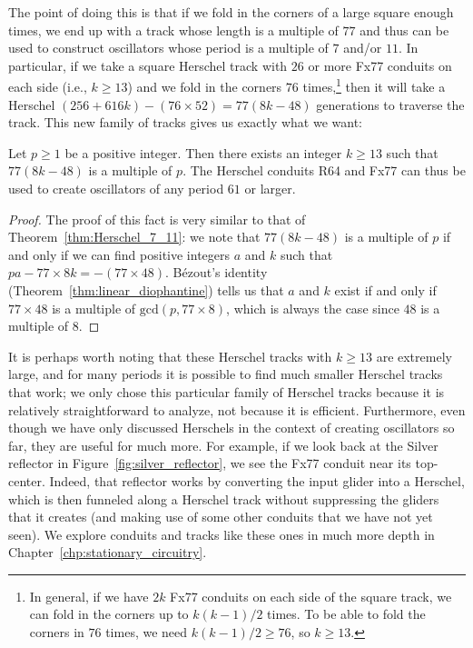 The point of doing this is that if we fold in the corners of a large square enough times, we end up with a track whose length is a multiple of $77$ and thus can be used to construct oscillators whose period is a multiple of $7$ and/or $11$. In particular, if we take a square Herschel track with $26$ or more Fx77 conduits on each side (i.e., $k \geq 13$) and we fold in the corners $76$ times,\footnote{In general, if we have $2k$ Fx77 conduits on each side of the square track, we can fold in the corners up to $k(k-1)/2$ times. To be able to fold the corners in $76$ times, we need $k(k-1)/2 \geq 76$, so $k \geq 13$.} then it will take a Herschel $(256 + 616k) - (76 \times 52) = 77(8k - 48)$ generations to traverse the track. This new family of tracks gives us exactly what we want:

\begin{theorem}\label{thm:Herschel_61}
	Let $p \geq 1$ be a positive integer. Then there exists an integer $k \geq 13$ such that $77(8k - 48)$ is a multiple of $p$. The Herschel conduits R64 and Fx77 can thus be used to create oscillators of any period $61$ or larger.
\end{theorem}

\begin{proof}
	The proof of this fact is very similar to that of Theorem~\ref{thm:Herschel_7_11}: we note that $77(8k - 48)$ is a multiple of $p$ if and only if we can find positive integers $a$ and $k$ such that $pa - 77 \times 8k = -(77 \times 48)$. B\'ezout's identity (Theorem~\ref{thm:linear_diophantine}) tells us that $a$ and $k$ exist if and only if $77 \times 48$ is a multiple of $\mathrm{gcd}(p,77 \times 8)$, which is always the case since $48$ is a multiple of $8$.
\end{proof}

It is perhaps worth noting that these Herschel tracks with $k \geq 13$ are extremely large, and for many periods it is possible to find much smaller Herschel tracks that work; we only chose this particular family of Herschel tracks because it is relatively straightforward to analyze, not because it is efficient. Furthermore, even though we have only discussed Herschels in the context of creating oscillators so far, they are useful for much more. For example, if we look back at the Silver reflector in Figure~\ref{fig:silver_reflector}, we see the Fx77 conduit near its top-center. Indeed, that reflector works by converting the input glider into a Herschel, which is then funneled along a Herschel track without suppressing the gliders that it creates (and making use of some other conduits that we have not yet seen). We explore conduits and tracks like these ones in much more depth in Chapter~\ref{chp:stationary_circuitry}.


